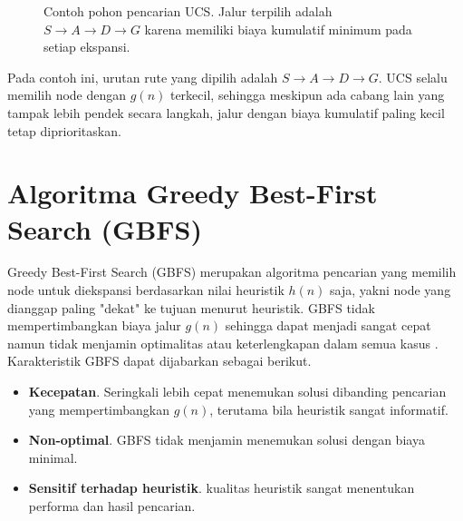 \begin{figure}[H]
    \centering
    \caption{Contoh pohon pencarian UCS. Jalur terpilih adalah $S \rightarrow A \rightarrow D \rightarrow G$ karena memiliki biaya kumulatif minimum pada setiap ekspansi.}
    \label{fig:contoh-ucs}
\end{figure}

Pada contoh ini, urutan rute yang dipilih adalah $S \rightarrow A \rightarrow D \rightarrow G$. UCS selalu memilih node dengan $g(n)$ terkecil, sehingga meskipun ada cabang lain yang tampak lebih pendek secara langkah, jalur dengan biaya kumulatif paling kecil tetap diprioritaskan.

\section{Algoritma Greedy Best-First Search (GBFS)}

Greedy Best-First Search (GBFS) merupakan algoritma pencarian yang memilih node untuk diekspansi berdasarkan nilai heuristik $h(n)$ saja, yakni node yang dianggap paling "dekat" ke tujuan menurut heuristik. GBFS tidak mempertimbangkan biaya jalur $g(n)$ sehingga dapat menjadi sangat cepat namun tidak menjamin optimalitas atau keterlengkapan dalam semua kasus \cite{russell2010artificial}. Karakteristik GBFS dapat dijabarkan sebagai berikut.
\begin{itemize}
    \item \textbf{Kecepatan}. Seringkali lebih cepat menemukan solusi dibanding pencarian yang mempertimbangkan $g(n)$, terutama bila heuristik sangat informatif.
    \item \textbf{Non-optimal}. GBFS tidak menjamin menemukan solusi dengan biaya minimal.
    \item \textbf{Sensitif terhadap heuristik}. kualitas heuristik sangat menentukan performa dan hasil pencarian.
\end{itemize}

